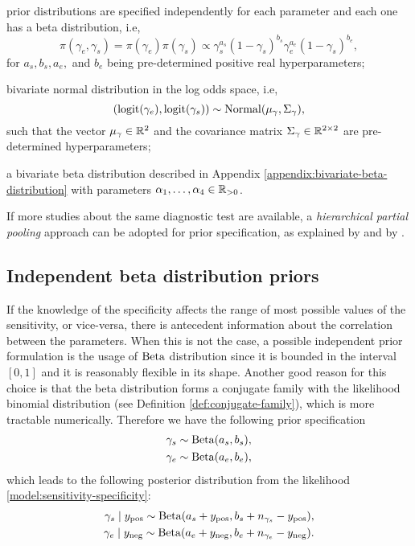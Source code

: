 \begin{alineas}
  \item prior distributions are specified independently for each parameter and
  each one has a beta distribution, i.e,  
  $$\pi(\gamma_e, \gamma_s) =
  \pi(\gamma_e)\pi(\gamma_s) \propto \gamma_s^{a_s}(1-
  \gamma_s)^{b_s}\gamma_e^{a_e}(1-\gamma_s)^{b_e},$$
  for $a_s, b_s, a_e,$ and $b_e$ being pre-determined positive real hyperparameters;
  \item bivariate normal distribution in the log odds space, i.e,  
  $$(\operatorname{logit}(\gamma_e), \operatorname{logit}(\gamma_s)) \sim
  \operatorname{Normal}(\mu_{\gamma}, \Sigma_{\gamma}),$$
  such that the vector $\mu_{\gamma} \in \mathbb{R}^2$ and the covariance matrix
  $\Sigma_{\gamma} \in \mathbb{R}^{2\times 2}$ are pre-determined hyperparameters;
  \item a bivariate beta distribution described in Appendix \ref{appendix:bivariate-beta-distribution}
  with parameters $\alpha_1, \dots, \alpha_4 \in \mathbb{R}_{>0}$.
\end{alineas}

If more studies about the same diagnostic test are available, a {\em
hierarchical partial pooling} approach can be adopted for prior specification,
as explained by \textcite[p. 1272-1274]{gelman2020bayesian} and by
\textcite[p. 2-3]{guo2017bayesian}.  

\subsection{Independent beta distribution priors}

If the knowledge of the specificity affects the range of most possible values
of the sensitivity, or vice-versa, there is antecedent information about the
correlation between the parameters. When this is not the case, a possible
independent prior formulation is the usage of $\operatorname{Beta}$ distribution since
it is bounded in the interval $[0,1]$ and it is reasonably flexible in its
shape.  Another good reason for this choice is that the beta distribution
forms a conjugate family with the likelihood binomial distribution (see Definition
\ref{def:conjugate-family}), which is more tractable numerically. Therefore we
have the following prior specification 
\begin{equation*}
  \begin{aligned}
    \gamma_s &\sim \operatorname{Beta}(a_s, b_s), \\
    \gamma_e &\sim \operatorname{Beta}(a_e, b_e), \\
  \end{aligned}
\end{equation*}
which leads to the following posterior distribution from the likelihood
\eqref{model:sensitivity-specificity}:
\begin{equation*}
  \begin{aligned}
    \gamma_s \mid y_{\mathrm{pos}} \sim \operatorname{Beta}(a_s + y_{\mathrm{pos}}, b_s + n_{\gamma_s} - y_{\mathrm{pos}}), \\
    \gamma_e \mid y_{\mathrm{neg}} \sim \operatorname{Beta}(a_e + y_{\mathrm{neg}}, b_e + n_{\gamma_e} - y_{\mathrm{neg}}). \\
  \end{aligned}
\end{equation*}

